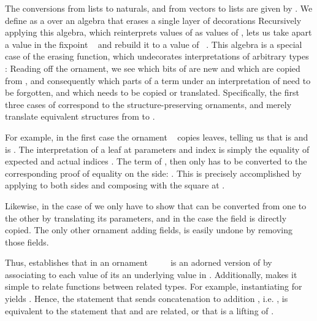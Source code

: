 The conversions from lists to naturals, and from vectors to lists are given by . We define  as a  over an algebra that erases a single layer of decorations
Recursively applying this algebra, which reinterprets values of  as values of , lets us take apart a value in the fixpoint \  and rebuild it to a value of \ . This algebra
is a special case of the erasing function, which undecorates interpretations of arbitrary types :
Reading off the ornament, we see which bits of  are new and which are copied from , and consequently which parts of a term  under an interpretation of  need to be forgotten, and which needs to be copied or translated. Specifically, the first three cases of  correspond to the structure-preserving ornaments, and merely translate equivalent structures from  to .

For example, in the first case the ornament \  copies leaves, telling us that  is  and  is . The interpretation  of a leaf  at parameters  and index  is simply the equality of expected and actual indices . The term  of , then only has to be converted to the corresponding proof of equality on the  side: . This is precisely accomplished by applying  to both sides and composing with the square  at .

Likewise, in the case of  we only have to show that  can be converted from one  to the other  by translating its parameters, and in the  case the field is directly copied. The only other ornament  adding fields, is easily undone by removing those fields. 

Thus,  establishes that  in an ornament \ \ \ \  is an adorned version of  by associating to each value of  its an underlying value in . Additionally,  makes it simple to relate functions between related types. For example, instantiating  for  yields . Hence, the statement that  sends concatenation \AF{\_++\_} to addition \AF{\_+\_}, i.e. , is equivalent to the statement that \AF{\_++\_} and \AF{\_+\_} are related, or that \AF{\_++\_} is a lifting of \AF{\_+\_} \cite{orntrans}. 

